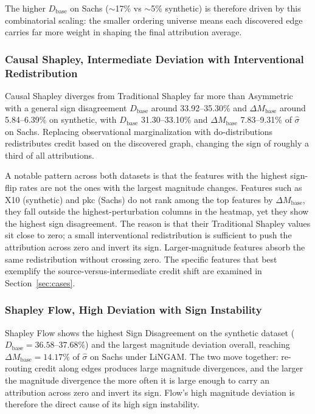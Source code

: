 \documentclass[12pt,a4paper,oneside]{article}
\begin{document}
The higher $D_{\text{base}}$ on Sachs ($\sim$17\% vs $\sim$5\% synthetic) is therefore driven by this combinatorial scaling: the smaller ordering universe means each discovered edge carries far more weight in shaping the final attribution average.

\subsubsection{Causal Shapley, Intermediate Deviation with Interventional Redistribution}

Causal Shapley diverges from Traditional Shapley far more than Asymmetric with a general sign disagreement $D_{\text{base}}$ around 33.92--35.30\% and $\Delta M_{\text{base}}$ around 5.84--6.39\% on synthetic, with $D_{\text{base}}$ 31.30--33.10\% and $\Delta M_{\text{base}}$ 7.83--9.31\% of $\hat{\sigma}$ on Sachs. Replacing observational marginalization with do-distributions redistributes credit based on the discovered graph, changing the sign of roughly a third of all attributions.

A notable pattern across both datasets is that the features with the highest sign-flip rates are not the ones with the largest magnitude changes. Features such as X10 (synthetic) and pkc (Sachs) do not rank among the top features by $\Delta M_{\text{base}}$, they fall outside the highest-perturbation columns in the heatmap, yet they show the highest sign disagreement. The reason is that their Traditional Shapley values sit close to zero; a small interventional redistribution is sufficient to push the attribution across zero and invert its sign. Larger-magnitude features absorb the same redistribution without crossing zero. The specific features that best exemplify the source-versus-intermediate credit shift are examined in Section~\ref{sec:cases}.

\subsubsection{Shapley Flow, High Deviation with Sign Instability}

Shapley Flow shows the highest Sign Disagreement on the synthetic dataset ($D_{\text{base}} = 36.58$--$37.68\%$) and the largest magnitude deviation overall, reaching $\Delta M_{\text{base}} = 14.17\%$ of $\hat{\sigma}$ on Sachs under LiNGAM. The two move together: re-routing credit along edges produces large magnitude divergences, and the larger the magnitude divergence the more often it is large enough to carry an attribution across zero and invert its sign. Flow's high magnitude deviation is therefore the direct cause of its high sign instability.
\end{document}
